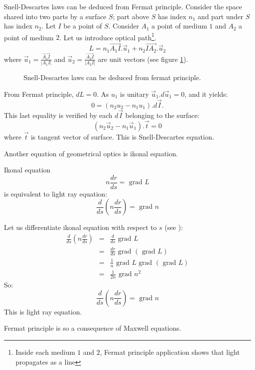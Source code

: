 \documentclass[12pt]{book}
\begin{document}
\begin{rem}
Snell-Descartes laws can be deduced from Fermat
principle. Consider the space shared into two parts by a surface $S$; part
above $S$ has index $n_1$ and part under $S$ has index $n_2$. Let $I$
be a point of $S$. Consider 
$A_1$ a point of medium $1$ and $A_2$  a point of medium $2$. Let us introduce
optical path\footnote{Inside each medium $1$ and $2$, Fermat principle
  application shows that light propagates as a line}.
\begin{equation}
L=n_1\vec{A_1I}.\vec{u}_1+n_2\vec{IA_2}.\vec{u}_2
\end{equation}
where $\vec{u}_1=\frac {\vec{A_1I}}{|A_1I|}$ and $\vec{u}_2=\frac
{\vec{A_2I}}{|A_2I|}$ are unit vectors (see figure \ref{figfermat}). 
\begin{figure}[htb]
 \centerline{}   
 \caption{Snell-Descartes laws can be deduced from fermat principle.}
 \label{figfermat}
\end{figure}
From Fermat principle, $dL=0$.
As $u_1$ is unitary $\vec{u}_1.d\vec{u}_1=0$, and it yields:
\begin{equation}
0=(n_2u_2-n_1u_1).d\vec{I}.
\end{equation}
This last equality is verified by each $d\vec{I}$ belonging to the surface:
\begin{equation}
(n_2\vec{u}_2-n_1\vec{u}_1).\vec t=0
\end{equation}
where $\vec t$ is tangent vector of surface. This is Snell-Descartes equation.
\end{rem}
Another equation of geometrical optics is ikonal equation.
\begin{thm}
Ikonal equation
\begin{equation}
n\frac{dr}{ds}=\mbox{ grad } L
\end{equation}
is equivalent to light ray equation:
\begin{equation}
\frac{d}{ds}(n\frac{dr}{ds})=\mbox{ grad } n
\end{equation}
\end{thm}
\begin{pf}
Let us differentiate ikonal equation with respect to $s$ (see
\cite{ph:optic:Born65}): 
\begin{eqnarray}
\frac{d}{ds}(n\frac{dr}{ds})&=&\frac{d}{ds} \mbox{ grad } L\\
&=&\frac{dr}{ds} \mbox{ grad }(\mbox{ grad } L)\\
&=&\frac{1}{n} \mbox{ grad } L  \mbox{ grad }(\mbox{ grad } L)\\
&=&\frac{1}{2n} \mbox{ grad } n^2
\end{eqnarray}
So:
\begin{equation}
\frac{d}{ds}(n\frac{dr}{ds})=\mbox{ grad } n
\end{equation}
This is light ray equation.
\end{pf}
Fermat principle is so a consequence of Maxwell equations.
\end{document}
